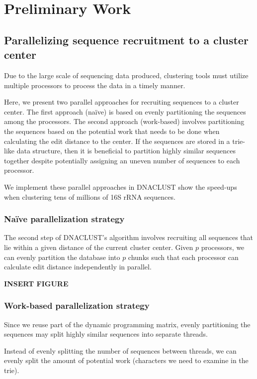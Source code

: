 \section{Preliminary Work}

\subsection{Parallelizing sequence recruitment to a cluster center}

Due to the large scale of sequencing data produced, clustering tools must utilize multiple processors to process the data in a timely manner.

Here, we present two parallel approaches for recruiting sequences to a cluster center.
The first approach (na{\"i}ve) is based on evenly partitioning the sequences among the processors.
The second approach (work-based) involves partitioning the sequences based on the potential work that needs to be done when calculating the edit distance to the center.
If the sequences are stored in a trie-like data structure, then it is beneficial to partition highly similar sequences together despite potentially assigning an uneven number of sequences to each processor.

We implement these parallel approaches in DNACLUST\cite{ghodsi_dnaclust:_2011} show the speed-ups when clustering tens of millions of 16S rRNA sequences. 

\subsubsection{Na{\"i}ve parallelization strategy}

The second step of DNACLUST's algorithm involves recruiting all sequences that lie within a given distance of the current cluster center.
Given $p$ processors, we can evenly partition the database into $p$ chunks such that each processor can calculate edit distance independently in parallel.

{\bf INSERT FIGURE}

\subsubsection{Work-based parallelization strategy}

Since we reuse part of the dynamic programming matrix, evenly partitioning the sequences may split highly similar sequences into separate threads.

Instead of evenly splitting the number of sequences between threads, we can evenly split the amount of potential work (characters we need to examine in the trie).

